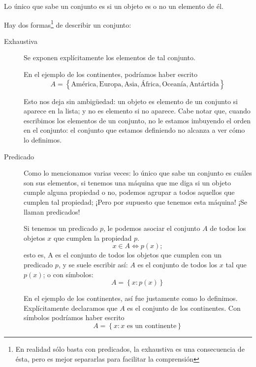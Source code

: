 \documentclass{book}
\newcommand{\set}[1]{\left\lbrace #1 \right\rbrace }
\theoremstyle{definition}
\begin{document}
Lo único que sabe un conjunto es si un objeto es o no un elemento de él.

Hay dos formas\footnote{En realidad sólo basta con predicados, la exhaustiva es una consecuencia de ésta, pero es mejor separarlas para facilitar la comprensión} de describir un conjunto:
\begin{description}
	\item[Exhaustiva] Se exponen explícitamente los elementos de tal conjunto.
	
	En el ejemplo de los continentes, podríamos haber escrito \[A = \set{\text{América}, \text{Europa}, \text{Asia}, \text{África}, \text{Oceanía}, \text{Antártida}}\]
	
	Esto nos deja sin ambigüedad: un objeto es elemento de un conjunto si aparece en la lista; y no es elemento si no aparece.
	Cabe notar que, cuando escribimos los elementos de un conjunto, no le estamos imbuyendo el orden en el conjunto: el conjunto que estamos definiendo no alcanza a ver cómo lo definimos.
	
	\item[Predicado] Como lo mencionamos varias veces: lo único que sabe un conjunto es cuáles son sus elementos, si tenemos una máquina que me diga si un objeto cumple alguna propiedad o no, podemos agrupar a todos aquellos que cumplen tal propiedad; ¡Pero por supuesto que tenemos esta máquina! ¡Se llaman predicados!
	
	Si tenemos un predicado $p$, le podemos asociar el conjunto $A$ de todos los objetos $x$ que cumplen la propiedad $p$. 
	\[x\in A \iff p(x);\]
	esto es, A es el conjunto de todos los objetos que cumplen con un predicado $p$, y se suele escribir así: $A$ es el conjunto de todos los $x$ tal que $p(x)$; o con símbolos:
	\[A = \set{x : p(x)}\]
	
	En el ejemplo de los continentes, así fue justamente como lo definimos. Explícitamente declaramos que $A$ es el conjunto de los continentes. Con símbolos podríamos haber escrito
	\[A = \set{x : x\text{ es un continente}}\]
\end{description}
\end{document}
